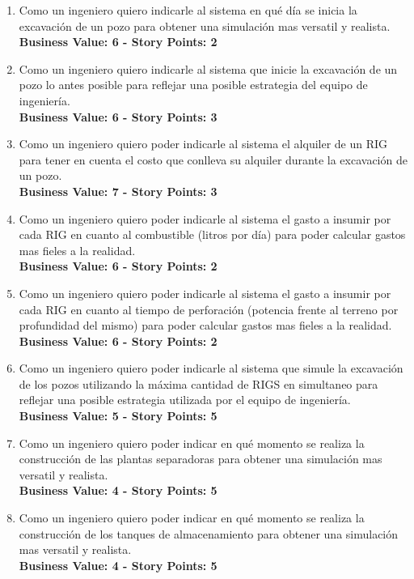 \begin{enumerate}
  \item Como un ingeniero quiero indicarle al sistema en qué día se inicia la excavación de un pozo para obtener una simulación mas versatil y realista.\\
  \textbf{Business Value: 6 - Story Points: 2}
  
  \item Como un ingeniero quiero indicarle al sistema que inicie la excavación de un pozo lo antes posible para reflejar una posible estrategia del equipo de ingeniería.\\
  \textbf{Business Value: 6 - Story Points: 3}
  
  \item Como un ingeniero quiero poder indicarle al sistema el alquiler de un RIG para tener en cuenta el costo que conlleva su alquiler durante la excavación de un pozo.\\
  \textbf{Business Value: 7 - Story Points: 3}
  
  \item Como un ingeniero quiero poder indicarle al sistema el gasto a insumir por cada RIG en cuanto al combustible (litros por día) para poder calcular gastos mas fieles a la realidad.\\
  \textbf{Business Value: 6 - Story Points: 2}
  
  \item Como un ingeniero quiero poder indicarle al sistema el gasto a insumir por cada RIG en cuanto al tiempo de perforación (potencia frente al terreno por profundidad del mismo) para poder calcular gastos mas fieles a la realidad.\\
  \textbf{Business Value: 6 - Story Points: 2}

  \item Como un ingeniero quiero poder indicarle al sistema que simule la excavación de los pozos utilizando la máxima cantidad de RIGS en simultaneo para reflejar una posible estrategia utilizada por el equipo de ingeniería.\\
  \textbf{Business Value: 5 - Story Points: 5}
  
  \item Como un ingeniero quiero poder indicar en qué momento se realiza la construcción de las plantas separadoras para obtener una simulación mas versatil y realista.\\
  \textbf{Business Value: 4 - Story Points: 5}
  
  \item Como un ingeniero quiero poder indicar en qué momento se realiza la construcción de los tanques de almacenamiento para obtener una simulación mas versatil y realista.\\
  \textbf{Business Value: 4 - Story Points: 5}
  

\end{enumerate}
